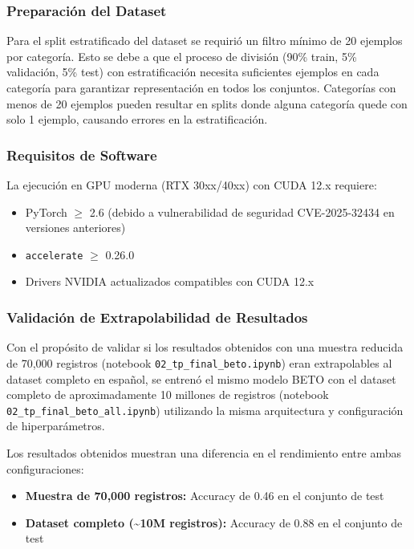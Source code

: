 \documentclass[11pt,a4paper]{article}
\begin{document}
\subsubsection{Preparación del Dataset}

Para el split estratificado del dataset se requirió un filtro mínimo de 20 ejemplos por categoría. Esto se debe a que el proceso de división (90\% train, 5\% validación, 5\% test) con estratificación necesita suficientes ejemplos en cada categoría para garantizar representación en todos los conjuntos. Categorías con menos de 20 ejemplos pueden resultar en splits donde alguna categoría quede con solo 1 ejemplo, causando errores en la estratificación.

\subsubsection{Requisitos de Software}

La ejecución en GPU moderna (RTX 30xx/40xx) con CUDA 12.x requiere:
\begin{itemize}
    \item PyTorch $\geq$ 2.6 (debido a vulnerabilidad de seguridad CVE-2025-32434 en versiones anteriores)
    \item \texttt{accelerate} $\geq$ 0.26.0
    \item Drivers NVIDIA actualizados compatibles con CUDA 12.x
\end{itemize}

\subsubsection{Validación de Extrapolabilidad de Resultados}

Con el propósito de validar si los resultados obtenidos con una muestra reducida de 70,000 registros (notebook \texttt{02\_tp\_final\_beto.ipynb}) eran extrapolables al dataset completo en español, se entrenó el mismo modelo BETO con el dataset completo de aproximadamente 10 millones de registros (notebook \texttt{02\_tp\_final\_beto\_all.ipynb}) utilizando la misma arquitectura y configuración de hiperparámetros.

Los resultados obtenidos muestran una diferencia en el rendimiento entre ambas configuraciones:

\begin{itemize}
    \item \textbf{Muestra de 70,000 registros:} Accuracy de 0.46 en el conjunto de test
    \item \textbf{Dataset completo (\textasciitilde10M registros):} Accuracy de 0.88 en el conjunto de test
\end{itemize}
\end{document}
